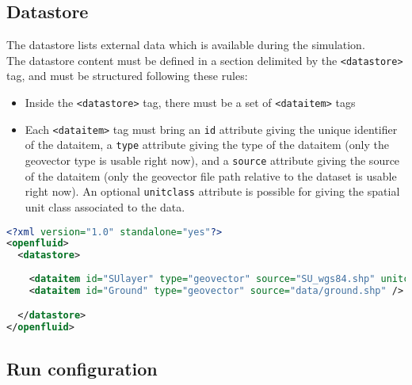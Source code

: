 \subsection{Datastore}

The datastore lists external data which is available during the simulation.\\
\noindent The datastore content must be defined in a section delimited by the
\texttt{<datastore>} tag, and must be structured following these rules:
\begin{itemize}
  \item Inside the \texttt{<datastore>} tag, there must be a set of \texttt{<dataitem>} tags
  \item Each \texttt{<dataitem>} tag must bring an \texttt{id} attribute giving
  the unique identifier of the dataitem, a \texttt{type} attribute giving the type
  of the dataitem (only the geovector type is usable right now), and a \texttt{source} 
  attribute giving the source of the dataitem (only the geovector file path relative
  to the dataset is usable right now). An optional \texttt{unitclass} 
  attribute is possible for giving the spatial unit class associated to the data. 
\end{itemize}

\begin{lstlisting}[language=xml,title=\footnotesize\textit{example}]
<?xml version="1.0" standalone="yes"?>
<openfluid>
  <datastore>
  
    <dataitem id="SUlayer" type="geovector" source="SU_wgs84.shp" unitclass="SU" />
    <dataitem id="Ground" type="geovector" source="data/ground.shp" />

  </datastore>
</openfluid>
\end{lstlisting}
\bigskip

\subsection{Run configuration}

